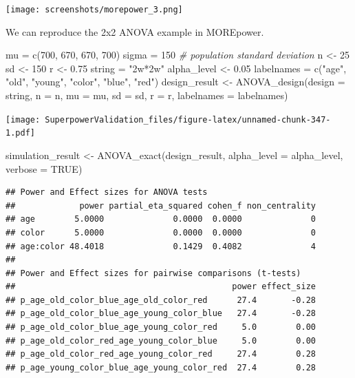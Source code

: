 \documentclass[
]{book}
\newenvironment{Shaded}{\begin{snugshade}}{\end{snugshade}}
\newcommand{\AttributeTok}[1]{\textcolor[rgb]{0.77,0.63,0.00}{#1}}
\newcommand{\CommentTok}[1]{\textcolor[rgb]{0.56,0.35,0.01}{\textit{#1}}}
\newcommand{\ConstantTok}[1]{\textcolor[rgb]{0.00,0.00,0.00}{#1}}
\newcommand{\DecValTok}[1]{\textcolor[rgb]{0.00,0.00,0.81}{#1}}
\newcommand{\FloatTok}[1]{\textcolor[rgb]{0.00,0.00,0.81}{#1}}
\newcommand{\FunctionTok}[1]{\textcolor[rgb]{0.00,0.00,0.00}{#1}}
\newcommand{\NormalTok}[1]{#1}
\newcommand{\OtherTok}[1]{\textcolor[rgb]{0.56,0.35,0.01}{#1}}
\newcommand{\StringTok}[1]{\textcolor[rgb]{0.31,0.60,0.02}{#1}}
\begin{document}
\texttt{[image: screenshots/morepower\_3.png]}

We can reproduce the 2x2 ANOVA example in MOREpower.

\begin{Shaded}
\begin{Highlighting}[]
\NormalTok{mu }\OtherTok{=} \FunctionTok{c}\NormalTok{(}\DecValTok{700}\NormalTok{, }\DecValTok{670}\NormalTok{, }\DecValTok{670}\NormalTok{, }\DecValTok{700}\NormalTok{) }
\NormalTok{sigma }\OtherTok{=} \DecValTok{150}  \CommentTok{\# population standard deviation}
\NormalTok{n }\OtherTok{\textless{}{-}} \DecValTok{25}
\NormalTok{sd }\OtherTok{\textless{}{-}} \DecValTok{150}
\NormalTok{r }\OtherTok{\textless{}{-}} \FloatTok{0.75}
\NormalTok{string }\OtherTok{=} \StringTok{"2w*2w"}
\NormalTok{alpha\_level }\OtherTok{\textless{}{-}} \FloatTok{0.05}
\NormalTok{labelnames }\OtherTok{=} \FunctionTok{c}\NormalTok{(}\StringTok{"age"}\NormalTok{, }\StringTok{"old"}\NormalTok{, }\StringTok{"young"}\NormalTok{, }\StringTok{"color"}\NormalTok{, }\StringTok{"blue"}\NormalTok{, }\StringTok{"red"}\NormalTok{)}
\NormalTok{design\_result }\OtherTok{\textless{}{-}} \FunctionTok{ANOVA\_design}\NormalTok{(}\AttributeTok{design =}\NormalTok{ string,}
                              \AttributeTok{n =}\NormalTok{ n, }
                              \AttributeTok{mu =}\NormalTok{ mu, }
                              \AttributeTok{sd =}\NormalTok{ sd, }
                              \AttributeTok{r =}\NormalTok{ r, }
                              \AttributeTok{labelnames =}\NormalTok{ labelnames)}
\end{Highlighting}
\end{Shaded}

\texttt{[image: SuperpowerValidation\_files/figure-latex/unnamed-chunk-347-1.pdf]}

\begin{Shaded}
\begin{Highlighting}[]
\NormalTok{simulation\_result }\OtherTok{\textless{}{-}} \FunctionTok{ANOVA\_exact}\NormalTok{(design\_result, }
                                 \AttributeTok{alpha\_level =}\NormalTok{ alpha\_level, }
                                 \AttributeTok{verbose =} \ConstantTok{TRUE}\NormalTok{)}
\end{Highlighting}
\end{Shaded}

\begin{verbatim}
## Power and Effect sizes for ANOVA tests
##             power partial_eta_squared cohen_f non_centrality
## age        5.0000              0.0000  0.0000              0
## color      5.0000              0.0000  0.0000              0
## age:color 48.4018              0.1429  0.4082              4
## 
## Power and Effect sizes for pairwise comparisons (t-tests)
##                                            power effect_size
## p_age_old_color_blue_age_old_color_red      27.4       -0.28
## p_age_old_color_blue_age_young_color_blue   27.4       -0.28
## p_age_old_color_blue_age_young_color_red     5.0        0.00
## p_age_old_color_red_age_young_color_blue     5.0        0.00
## p_age_old_color_red_age_young_color_red     27.4        0.28
## p_age_young_color_blue_age_young_color_red  27.4        0.28
\end{verbatim}
\end{document}
